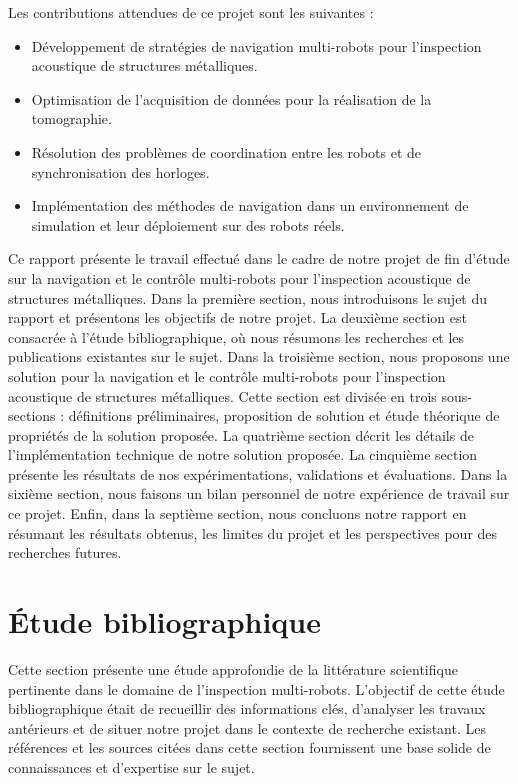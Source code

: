 \documentclass[francais,RandD]{rapportPFE}
\begin{document}
		Les contributions attendues de ce projet sont les suivantes :
		\begin{itemize}
			\item Développement de stratégies de navigation multi-robots pour l'inspection acoustique de structures métalliques.
			\item Optimisation de l'acquisition de données pour la réalisation de la tomographie.
			\item Résolution des problèmes de coordination entre les robots et de synchronisation des horloges.
			\item Implémentation des méthodes de navigation dans un environnement de simulation et leur déploiement sur des robots réels.
		\end{itemize}

		Ce rapport présente le travail effectué dans le cadre de notre projet de fin d'étude sur la navigation et le contrôle multi-robots pour l'inspection acoustique de structures métalliques.
		Dans la première section, nous introduisons le sujet du rapport et présentons les objectifs de notre projet.
		La deuxième section est consacrée à l'étude bibliographique, où nous résumons les recherches et les publications existantes sur le sujet.
		Dans la troisième section, nous proposons une solution pour la navigation et le contrôle multi-robots pour l'inspection acoustique de structures métalliques.
		Cette section est divisée en trois sous-sections : définitions préliminaires, proposition de solution et étude théorique de propriétés de la solution proposée.
		La quatrième section décrit les détails de l'implémentation technique de notre solution proposée.
		La cinquième section présente les résultats de nos expérimentations, validations et évaluations.
		Dans la sixième section, nous faisons un bilan personnel de notre expérience de travail sur ce projet.
		Enfin, dans la septième section, nous concluons notre rapport en résumant les résultats obtenus, les limites du projet et les perspectives pour des recherches futures.
	\section{Étude bibliographique}
		Cette section présente une étude approfondie de la littérature scientifique pertinente dans le domaine de l'inspection multi-robots.
		L'objectif de cette étude bibliographique était de recueillir des informations clés, d'analyser les travaux antérieurs et de situer notre projet dans le contexte de recherche existant.
		Les références et les sources citées dans cette section fournissent une base solide de connaissances et d'expertise sur le sujet.
\end{document}
